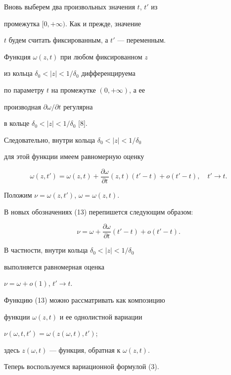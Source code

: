 \begin{pf}


Вновь выберем два произвольных значения $t$, $t'$ из


промежутка $[0,+\infty)$. Как и прежде, значение


$t$ будем считать фиксированным, а $t'$ --- переменным.


Функция $\omega(z,t)$ при любом фиксированном $z$


из кольца $\delta_{0}<|z|<1/\delta_{0}$ дифференцируема


по параметру $t$ на промежутке $(0,+\infty)$, а ее


производная $\partial \omega/\partial t$ регулярна


в кольце $\delta_{0}<|z|<1/\delta_{0}$ [8].


Следовательно, внутри кольца $\delta_{0}<|z|<1/\delta_{0}$


для этой функции имеем равномерную оценку


\begin{equation}


\omega(z,t')=\omega(z,t)+


\frac{\partial\omega}{\partial t}(z,t)(t'-t)+o(t'-t),\quad t'\to t.


\end{equation}


Положим $\nu=\omega(z,t')$, $\omega=\omega(z,t)$.


В новых обозначениях (13) перепишется следующим образом:


\begin{equation}


\nu=\omega+\frac{\partial \omega}{\partial t}(t'-t)+o(t'-t).


\end{equation}


В частности, внутри кольца $\delta_{0}<|z|<1/\delta_{0}$ 


выполняется равномерная оценка


$\nu=\omega+o(1)$, $t'\to t$.


Функцию (13) можно рассматривать как композицию


функции $\omega(z,t)$ и ее однолистной вариации


$\nu(\omega,t,t')=\omega(z(\omega,t),t')$;


здесь $z(\omega,t)$ --- функция, обратная к $\omega(z,t)$.





Теперь воспользуемся вариационной формулой (3).



\end{pf}
